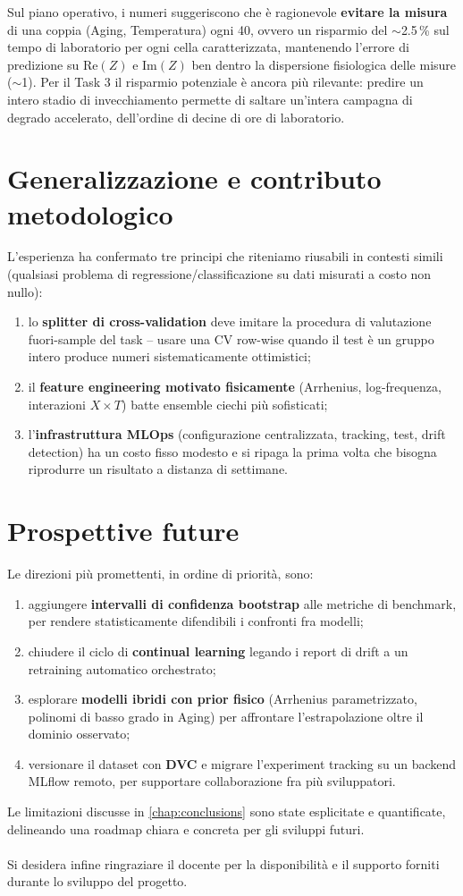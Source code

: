 Sul piano operativo, i numeri suggeriscono che è
ragionevole \textbf{evitare la misura} di una coppia (Aging,
Temperatura) ogni 40, ovvero un risparmio del $\sim$2.5\,\% sul tempo
di laboratorio per ogni cella caratterizzata, mantenendo l'errore di
predizione su $\mathrm{Re}(Z)$ e $\mathrm{Im}(Z)$ ben dentro la
dispersione fisiologica delle misure ($\sim$\SI{1}{\milliohm}). Per il
Task 3 il risparmio potenziale è ancora più rilevante: predire un
intero stadio di invecchiamento permette di saltare un'intera campagna
di degrado accelerato, dell'ordine di decine di ore di laboratorio.

\section*{Generalizzazione e contributo metodologico}

L'esperienza ha confermato tre principi che riteniamo riusabili in
contesti simili (qualsiasi problema di regressione/classificazione su
dati misurati a costo non nullo):
\begin{enumerate}[leftmargin=*]
  \item lo \textbf{splitter di cross-validation} deve imitare la
        procedura di valutazione fuori-sample del task -- usare una
        CV row-wise quando il test è un gruppo intero produce numeri
        sistematicamente ottimistici;
  \item il \textbf{feature engineering motivato fisicamente}
        (Arrhenius, log-frequenza, interazioni $X \times T$) batte
        ensemble ciechi più sofisticati;
  \item l'\textbf{infrastruttura MLOps} (configurazione centralizzata,
        tracking, test, drift detection) ha un costo fisso modesto e
        si ripaga la prima volta che bisogna riprodurre un risultato a
        distanza di settimane.
\end{enumerate}

\section*{Prospettive future}

Le direzioni più promettenti, in ordine di priorità, sono:
\begin{enumerate}[leftmargin=*]
  \item aggiungere \textbf{intervalli di confidenza bootstrap} alle
        metriche di benchmark, per rendere statisticamente difendibili
        i confronti fra modelli;
  \item chiudere il ciclo di \textbf{continual learning} legando i
        report di drift a un retraining automatico orchestrato;
  \item esplorare \textbf{modelli ibridi con prior fisico} (Arrhenius
        parametrizzato, polinomi di basso grado in Aging) per
        affrontare l'estrapolazione oltre il dominio osservato;
  \item versionare il dataset con \textbf{DVC} e migrare l'experiment
        tracking su un backend MLflow remoto, per supportare
        collaborazione fra più sviluppatori.\\
\end{enumerate}

Le limitazioni discusse in \cref{chap:conclusions} sono state esplicitate e quantificate, delineando una roadmap chiara e concreta per gli sviluppi futuri.
\\\\
Si desidera infine ringraziare il docente per la disponibilità e il supporto forniti durante lo sviluppo del progetto.
